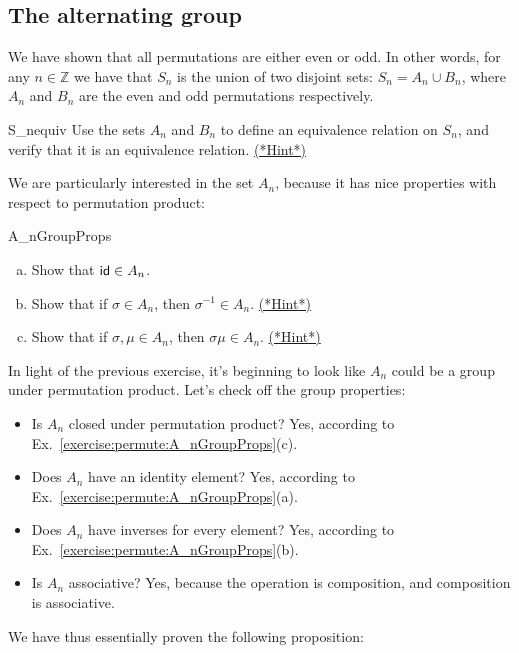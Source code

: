 \subsection{The alternating group}\label{sec:AlternatingGroup}

We have shown that all permutations are either even or odd. In other words, for any $n \in \mathbb{Z}$ we have that $S_n$ is the union of two disjoint sets: $S_n = A_n \cup B_n$, where $A_n$ and $B_n$ are the even and odd permutations respectively.

\begin{exercise}{S_nequiv}
Use the sets $A_n$ and $B_n$ to define an equivalence relation on $S_n$, and verify that it is an equivalence relation.
\hyperref[sec:permute:hints]{(*Hint*)}
\end{exercise}

We are particularly interested in the set $A_n$, because it has nice properties with respect to permutation product:

\begin{exercise}{A_nGroupProps}
\begin{enumerate}[(a)]
\item
Show that ${\sf{i}d}  \in A_n$.
\item
Show that if $\sigma \in A_n$, then $\sigma^{-1} \in A_n$.
\hyperref[sec:permute:hints]{(*Hint*)}
\item
Show that if $\sigma, \mu \in A_n$, then $\sigma \mu \in A_n$. 
\hyperref[sec:permute:hints]{(*Hint*)}
\end{enumerate}
\end{exercise}

In light of the previous exercise, it's beginning to look like $A_n$ could be a group under permutation product. Let's check off the group properties:
\begin{itemize}
\item Is $A_n$ closed under permutation product? Yes, according to Ex.~\ref{exercise:permute:A_nGroupProps}(c).
\item Does $A_n$ have an identity element? Yes, according to Ex.~\ref{exercise:permute:A_nGroupProps}(a).
\item Does $A_n$ have inverses for every element? Yes, according to Ex.~\ref{exercise:permute:A_nGroupProps}(b).
\item Is $A_n$ associative? Yes, because the operation is composition, and composition is associative.
\end{itemize}

\noindent
We have thus essentially proven the following proposition:

